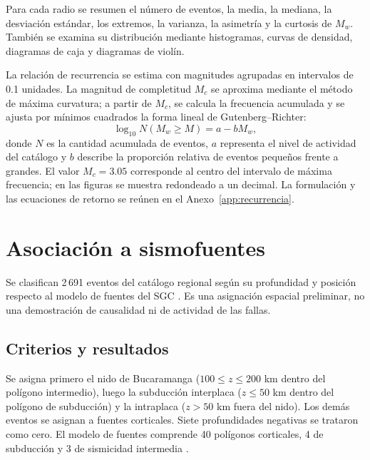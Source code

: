 \documentclass[12pt,oneside]{report}
\begin{document}
Para cada radio se resumen el número de eventos, la media, la mediana, la
desviación estándar, los extremos, la varianza, la asimetría y la curtosis de
$M_w$. También se examina su distribución mediante histogramas, curvas de
densidad, diagramas de caja y diagramas de violín.

La relación de recurrencia se estima con magnitudes agrupadas en intervalos de
0.1 unidades. La magnitud de completitud $M_c$ se aproxima mediante el método
de máxima curvatura; a partir de $M_c$, se calcula la frecuencia acumulada y
se ajusta por mínimos cuadrados la forma lineal de Gutenberg--Richter:
\begin{equation}
    \log_{10} N(M_w\geq M)=a-bM_w,
    \label{eq:gutenberg-richter}
\end{equation}
donde $N$ es la cantidad acumulada de eventos, $a$ representa el nivel de
actividad del catálogo y $b$ describe la proporción relativa de eventos
pequeños frente a grandes. El valor $M_c=3.05$ corresponde al centro del
intervalo de máxima frecuencia; en las figuras se muestra redondeado a un
decimal. La formulación y las ecuaciones de retorno
se reúnen en el Anexo~\ref{app:recurrencia}.

\chapter{Asociación a sismofuentes}

Se clasifican 2\,691 eventos del catálogo regional según su profundidad y
posición respecto al modelo de fuentes del SGC
\parencite{criteriosAsociacionNeiva2026,sgcModeloFuentes}. Es una asignación
espacial preliminar, no una demostración de causalidad ni de actividad de las
fallas.

\section{Criterios y resultados}

Se asigna primero el nido de Bucaramanga ($100\leq z\leq200$ km dentro del
polígono intermedio), luego la subducción interplaca ($z\leq50$ km dentro del
polígono de subducción) y la intraplaca ($z>50$ km fuera del nido). Los demás
eventos se asignan a fuentes corticales. Siete profundidades negativas se
trataron como cero. El modelo de fuentes comprende 40 polígonos corticales, 4
de subducción y 3 de sismicidad intermedia \parencite{sgcModeloFuentes}.
\end{document}
